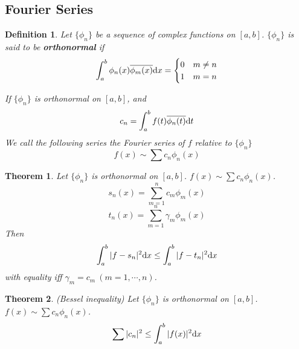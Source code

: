 \documentclass[aps,pra,onecolumn,notitlepage,superscriptaddress]{revtex4-1}
\def\d{{\rm d}}
\newtheorem{theo}{Theorem}
\newtheorem{defi}{Definition}
\begin{document}
    \subsection{Fourier Series}
    \begin{defi}
        Let $\{ \phi_n \}$ be a sequence of complex functions on $[a,b]$. $\{ \phi_n \}$ is said to be \textbf{orthonormal} if 
        \begin{equation}
            \int_a^b \phi_n(x) \overline{\phi_m(x)} \d x = \begin{cases}
                0 & m \neq n \\
                1 & m = n
            \end{cases}
        \end{equation}

        If $\{ \phi_n \}$ is orthonormal on $[a,b]$, and
        \begin{equation}
            c_n = \int_a^b f(t) \overline{\phi_n(t)} \d t
        \end{equation}
        We call the following series the Fourier series of $f$ relative to $\{ \phi_n \}$
        \begin{equation}
            f(x) \sim \sum c_n \phi_n (x)
        \end{equation}
    \end{defi}

    \begin{theo}
        Let $\{ \phi_n \}$ is orthonormal on $[a,b]$. $f(x) \sim \sum c_n \phi_n (x)$.
        \begin{equation}
            s_n(x) = \sum_{m=1}^n c_m \phi_m (x)
        \end{equation}
        \begin{equation}
            t_n(x) = \sum_{m=1}^n \gamma_m \phi_m (x)
        \end{equation}
        Then
        \begin{equation}
            \int_a^b | f-s_n |^2 \d x \leq \int_a^b | f-t_n |^2 \d x
        \end{equation}
        with equality iff $\gamma_m = c_m \ (m=1,\cdots,n)$.
    \end{theo}

    \begin{theo}
        (Bessel inequality) Let $\{ \phi_n \}$ is orthonormal on $[a,b]$. $f(x) \sim \sum c_n \phi_n (x)$.
        \begin{equation}
            \sum |c_n|^2 \leq \int_a^b |f(x)|^2 \d x
        \end{equation}
    \end{theo}
\end{document}
